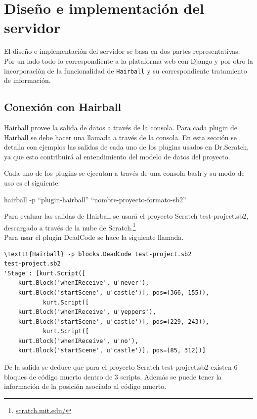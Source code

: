 \documentclass[a4paper, 12pt]{book}
\begin{document}
\section{Diseño e implementación del servidor}
\label{sec:servidor}

El diseño e implementación del servidor se basa en dos partes representativas. Por un lado todo lo
correspondiente a la plataforma web con Django y por otro la incorporación de la funcionalidad de
\texttt{Hairball} y su correspondiente tratamiento de información.

\subsection{Conexión con Hairball}
Hairball provee la salida de datos a través de la consola. Para cada plugin de Hairball se debe hacer una llamada
a través de la consola. En esta sección se detalla con ejemplos las salidas de cada uno de los plugins usados en
Dr.Scratch, ya que esto contribuirá al entendimiento del modelo de datos del proyecto.

Cada uno de los plugins se ejecutan a través de una consola bash y su modo de uso es el siguiente:

\begin{center}
hairball -p "`plugin-hairball"' "`nombre-proyecto-formato-sb2"'
\end{center}

Para evaluar las salidas de Hairball se usará el proyecto Scratch test-project.sb2, descargado a través de la 
nube de Scratch.\footnote{\url{scratch.mit.edu/}} \\

Para usar el plugin DeadCode se hace la siguiente llamada.
\begingroup
\fontsize{7pt}{8pt}\selectfont
\begin{verbatim}
\texttt{Hairball} -p blocks.DeadCode test-project.sb2 
test-project.sb2 
'Stage': [kurt.Script([ 
    kurt.Block('whenIReceive', u'never'), 
    kurt.Block('startScene', u'castle')], pos=(366, 155)), 
           kurt.Script([  
    kurt.Block('whenIReceive', u'yeppers'), 
    kurt.Block('startScene', u'castle')], pos=(229, 243)), 
           kurt.Script([ 
    kurt.Block('whenIReceive', u'no'), 
    kurt.Block('startScene', u'castle')], pos=(85, 312))] 
\end{verbatim}
\endgroup

De la salida se deduce que para el proyecto Scratch test-project.sb2 existen 6 bloques de código
muerto dentro de 3 scripts. Además se puede tener la información de la posición asociado al código
muerto. 
\end{document}
